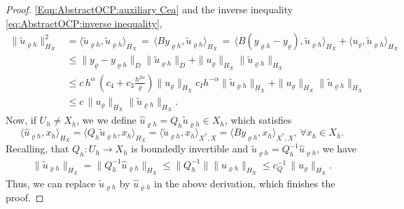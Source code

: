 \documentclass{article}
\newcommand{\norm}[1]{\|#1\|}
\newcommand{\skpr}[1]{\langle#1\rangle}
\numberwithin{equation}{section}
\begin{document}
\begin{proof}
  \eqref{Eqn:AbstractOCP:auxiliary Cea} and the inverse inequality
  \eqref{eq:AbstractOCP:inverse inequality},
  \begin{align*}
    \norm{\widetilde{u}_{\varrho h}}_{H_X}^2
    & = \skpr{\widetilde{u}_{\varrho h},\widetilde{u}_{\varrho h}}_{H_X} \, = \,
      \skpr{By_{\varrho h},\widetilde{u}_{\varrho h}}_{H_X} \, = \,
      \skpr{B(y_{\varrho h} - y_\varrho),\widetilde{u}_{\varrho h}}_{H_X} +
      \skpr{u_\varrho,\widetilde{u}_{\varrho h}}_{H_X}\\
    & \leq \norm{y_\varrho - y_{\varrho h}}_{D}
      \norm{\widetilde{u}_{\varrho h}}_{D} +
      \norm{u_\varrho}_{H_X}\norm{\widetilde{u}_{\varrho h}}_{H_X}\\
    & \leq c \, h^\alpha \, \left(
      c_4+c_3\frac{h^{2\alpha}}{\varrho}\right)
      \norm{u_\varrho}_{H_X}c_Ih^{-\alpha}\norm{\widetilde{u}_{\varrho h}}_{H_X}
      + \norm{u_\varrho}_{H_X}\norm{\widetilde{u}_{\varrho h}}_{H_X} \\
    & \leq c \, \norm{u_\varrho}_{H_X}\norm{\widetilde{u}_{\varrho h}}_{H_X}.  
  \end{align*}
  Now, if $U_h\neq X_h$, we we define
  $\widehat{u}_{\varrho h} = Q_h\widetilde{u}_{\varrho h}\in X_h$, which satisfies
  \begin{equation*}
    \skpr{\widehat{u}_{\varrho h},x_h}_{H_X} =
    \skpr{Q_h\widetilde{u}_{\varrho h},x_h}_{H_X} =
    \skpr{\widetilde{u}_{\varrho h},x_h}_{X^\ast,X} =
    \skpr{By_{\varrho h},x_h}_{X^\ast,X},\, \forall x_h\in X_h.   
  \end{equation*}
  Recalling, that $Q_h:U_h\to X_h$ is boundedly invertible and
  $\widetilde{u}_{\varrho h} = Q_h^{-1}\widehat{u}_{\varrho h}$, we have
  \begin{align*}
    \norm{\widetilde{u}_{\varrho h}}_{H_X} =
    \norm{Q_h^{-1}\widehat{u}_{\varrho h}}_{H_X} \leq
    \norm{Q_h^{-1}}\norm{\widehat{u}_{\varrho h}}_{H_X} \leq
    c_Q^{-1} \, \norm{u_\varrho}_{H_X}.
  \end{align*}
  Thus, we can replace $\widetilde{u}_{\varrho h}$ by $\widehat{u}_{\varrho h}$
  in the above derivation, which finishes the proof. 
\end{proof}


%
%
%
%
\end{document}
